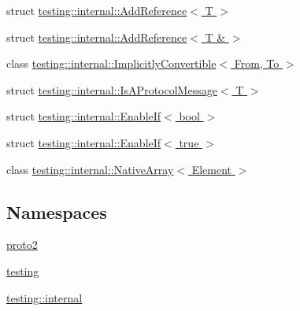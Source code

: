 \begin{DoxyCompactItemize}
\item 
struct \hyperlink{structtesting_1_1internal_1_1_add_reference}{testing\+::internal\+::\+Add\+Reference$<$ T $>$}
\item 
struct \hyperlink{structtesting_1_1internal_1_1_add_reference_3_01_t_01_6_01_4}{testing\+::internal\+::\+Add\+Reference$<$ T \& $>$}
\item 
class \hyperlink{classtesting_1_1internal_1_1_implicitly_convertible}{testing\+::internal\+::\+Implicitly\+Convertible$<$ From, To $>$}
\item 
struct \hyperlink{structtesting_1_1internal_1_1_is_a_protocol_message}{testing\+::internal\+::\+Is\+A\+Protocol\+Message$<$ T $>$}
\item 
struct \hyperlink{structtesting_1_1internal_1_1_enable_if}{testing\+::internal\+::\+Enable\+If$<$ bool $>$}
\item 
struct \hyperlink{structtesting_1_1internal_1_1_enable_if_3_01true_01_4}{testing\+::internal\+::\+Enable\+If$<$ true $>$}
\item 
class \hyperlink{classtesting_1_1internal_1_1_native_array}{testing\+::internal\+::\+Native\+Array$<$ Element $>$}
\end{DoxyCompactItemize}
\subsection*{Namespaces}
\begin{DoxyCompactItemize}
\item 
 \hyperlink{namespaceproto2}{proto2}
\item 
 \hyperlink{namespacetesting}{testing}
\item 
 \hyperlink{namespacetesting_1_1internal}{testing\+::internal}
\end{DoxyCompactItemize}
